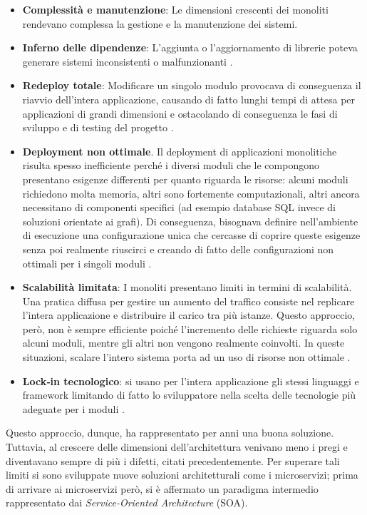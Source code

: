 \begin{itemize}
    \item \textbf{Complessità e manutenzione}: Le dimensioni crescenti dei monoliti rendevano complessa la gestione e la manutenzione dei sistemi\cite{Dragoni2017}.
    \item \textbf{Inferno delle dipendenze}: L’aggiunta o l’aggiornamento di librerie poteva generare sistemi inconsistenti o malfunzionanti \cite{Dragoni2017}.
    \item \textbf{Redeploy totale}: Modificare un singolo modulo provocava di conseguenza il riavvio dell'intera applicazione, causando di fatto lunghi tempi di attesa per applicazioni di grandi dimensioni e ostacolando di conseguenza le fasi di sviluppo e di testing del progetto \cite{Dragoni2017, Newman2015}.
    \item \textbf{Deployment non ottimale}. Il deployment di applicazioni monolitiche risulta spesso inefficiente perché i diversi moduli che le compongono presentano esigenze differenti per quanto riguarda le risorse: alcuni moduli richiedono molta memoria, altri sono fortemente computazionali, altri ancora necessitano di componenti specifici (ad esempio database SQL invece di soluzioni orientate ai grafi). Di conseguenza, bisognava definire nell'ambiente di esecuzione una configurazione unica che cercasse di coprire queste esigenze senza poi realmente riuscirci e creando di fatto delle configurazioni non ottimali per i singoli moduli \cite{Dragoni2017}.
    \item \textbf{Scalabilità limitata}: I monoliti presentano limiti in termini di scalabilità. Una pratica diffusa per gestire un aumento del traffico consiste nel replicare l’intera applicazione e distribuire il carico tra più istanze. Questo approccio, però, non è sempre efficiente poiché l’incremento delle richieste riguarda solo alcuni moduli, mentre gli altri non vengono realmente coinvolti. In queste situazioni, scalare l’intero sistema porta ad un uso di risorse non ottimale \cite{Dragoni2017}.
    \item \textbf{Lock‑in tecnologico}: si usano per l'intera applicazione gli stessi linguaggi e framework limitando di fatto lo sviluppatore nella scelta delle tecnologie più adeguate per i moduli \cite{Dragoni2017}.
\end{itemize}

Questo approccio, dunque, ha rappresentato per anni una buona soluzione. Tuttavia, al crescere delle dimensioni dell'architettura venivano meno i pregi e diventavano sempre di più i difetti, citati precedentemente.
Per superare tali limiti si sono sviluppate nuove soluzioni architetturali come i microservizi; prima di arrivare ai microservizi però, si è affermato un paradigma intermedio rappresentato dai \textit{Service-Oriented Architecture} (SOA).


